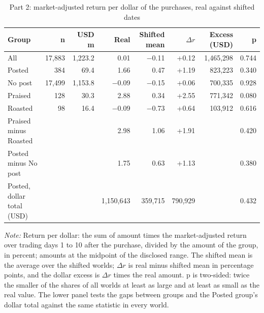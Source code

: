 \begin{table}[htbp]
\centering
\small
\setlength{\tabcolsep}{4pt}
\caption{Part 2: market-adjusted return per dollar of the purchases, real against shifted dates}
\label{tab:part2}
\begin{tabular}{lrrrrrrr}
\toprule
Group & n & USD m & Real & Shifted mean & $\Delta r$ & Excess (USD) & p \\
\midrule
All & 17,883 & 1,223.2 & 0.01 & $-$0.11 & +0.12 & 1,465,298 & 0.744 \\
Posted & 384 & 69.4 & 1.66 & 0.47 & +1.19 & 823,223 & 0.340 \\
No post & 17,499 & 1,153.8 & $-$0.09 & $-$0.15 & +0.06 & 700,335 & 0.928 \\
Praised & 128 & 30.3 & 2.88 & 0.34 & +2.55 & 771,342 & 0.080 \\
Roasted & 98 & 16.4 & $-$0.09 & $-$0.73 & +0.64 & 103,912 & 0.616 \\
\midrule
Praised minus Roasted &  &  & 2.98 & 1.06 & +1.91 &  & 0.420 \\
Posted minus No post &  &  & 1.75 & 0.63 & +1.13 &  & 0.380 \\
Posted, dollar total (USD) &  &  & 1,150,643 & 359,715 & 790,929 &  & 0.432 \\
\bottomrule
\end{tabular}
\par\medskip
\begin{minipage}{\linewidth}\footnotesize\textit{Note:} Return per dollar: the sum of amount times the market-adjusted return over trading days 1 to 10 after the purchase, divided by the amount of the group, in percent; amounts at the midpoint of the disclosed range. The shifted mean is the average over the shifted worlds; $\Delta r$ is real minus shifted mean in percentage points, and the dollar excess is $\Delta r$ times the real amount. p is two-sided: twice the smaller of the shares of all worlds at least as large and at least as small as the real value. The lower panel tests the gaps between groups and the Posted group's dollar total against the same statistic in every world.\end{minipage}
\end{table}
